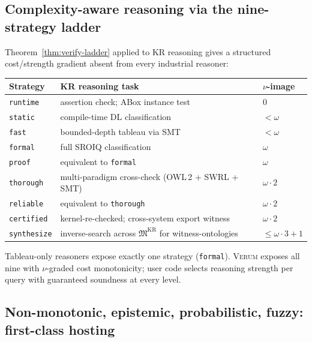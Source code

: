 \documentclass[11pt, a4paper]{article}
\theoremstyle{definition}
\theoremstyle{remark}
\newcommand{\fM}{\mathfrak{M}}
\newcommand{\Verum}{\textsc{Verum}}
\begin{document}
\subsection{Complexity-aware reasoning via the nine-strategy ladder}
\label{subsec:kr-complexity-ladder}

Theorem~\ref{thm:verify-ladder} applied to KR reasoning gives a structured cost/strength gradient absent from every industrial reasoner:

\begin{center}
\small
\begin{tabular}{@{}lll@{}}
\toprule
Strategy & KR reasoning task & $\nu$-image \\ \midrule
\texttt{runtime}   & assertion check; ABox instance test & $0$ \\
\texttt{static}    & compile-time DL classification & $< \omega$ \\
\texttt{fast}      & bounded-depth tableau via SMT & $< \omega$ \\
\texttt{formal}    & full \textsf{SROIQ} classification & $\omega$ \\
\texttt{proof}     & equivalent to \texttt{formal} & $\omega$ \\
\texttt{thorough}  & multi-paradigm cross-check (OWL\,2 + SWRL + SMT) & $\omega \cdot 2$ \\
\texttt{reliable}  & equivalent to \texttt{thorough} & $\omega \cdot 2$ \\
\texttt{certified} & kernel-re-checked; cross-system export witness & $\omega \cdot 2$ \\
\texttt{synthesize} & inverse-search across $\fM^{\mathrm{KR}}$ for witness-ontologies & $\leq \omega \cdot 3 + 1$ \\
\bottomrule
\end{tabular}
\end{center}

Tableau-only reasoners expose exactly one strategy (\texttt{formal}). \Verum{} exposes all nine with $\nu$-graded cost monotonicity; user code selects reasoning strength per query with guaranteed soundness at every level.

\subsection{Non-monotonic, epistemic, probabilistic, fuzzy: first-class hosting}
\label{subsec:kr-extensions}
\end{document}
